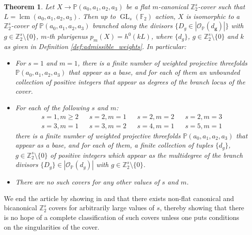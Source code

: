 \documentclass[12pt,twoside,]{amsart}
\theoremstyle{plain}
\newtheorem{theorem}{Theorem}[subsection]
\theoremstyle{definition}
\begin{document}
 
\begin{theorem}\label{thm:flat_pluricanonical_covers}
Let $X \rightarrow \mathbb{P}(a_0, a_1, a_2, a_3)$ be a flat $m$-canonical $\mathbb{Z}_2^s$-cover such that $L = \operatorname{lcm}(a_0, a_1, a_2, a_3)$. Then up to $\operatorname{GL}_s(\mathbb{F}_2)$ action,  $X$ is isomorphic to a $\mathbb{Z}_2^s$-cover of $\mathbb{P}(a_0,a_1,a_2,a_3)$ branched along the divisors $\{D_g \in |\mathcal{O}_{\mathbb{P}}(d_\mathbf{g})|\}$ with ${g \in \mathbb{Z}_2^s \setminus \{0\}}$, $m$-th plurigenus $p_m(X) = h^0(kL)$, where $\{d_g\}$, $g \in \mathbb{Z}_2^s \setminus \{0\}$ and $k$ as given in Definition \ref{def:admissible_weights}. In particular:
\begin{itemize}
 \item[(i)] For $s=1$ and $m=1$, there is a finite number of weighted projective threefolds $\mathbb{P}(a_0, a_1, a_2,a_3)$ that appear as a base, and for each of them an unbounded collection of positive integers that appear as degrees of the branch locus of the cover. 
\item[(ii)] For each of the following $s$ and $m$:
\begin{align*}
s=1, m\geq 2 && s = 2, m=1 &&    s = 2, m=2 && s = 2, m=3 \\
s = 3, m=1 && s=3, m=2 &&s= 4, m=1 &&s=5, m=1
\end{align*}
there is a finite number of weighted projective threefolds $\mathbb{P}(a_0, a_1, a_2,a_3)$ that appear as a base, and for each of them, a finite collection of tuples $\{d_g\}$, $g \in \mathbb{Z}_2^s \setminus \{0\}$ of positive integers which appear as the multidegree of the branch divisors 
$\{D_g\} \in |\mathcal{O}_{\mathbb{P}}(d_g)|$ with $g \in \mathbb{Z}_2^s \setminus \{0\} $. 
\item[(iii)] There are no such covers for any other values of $s$ and $m$.
\end{itemize}
\end{theorem}
 
We end the article by showing in  and  that there exists non-flat canonical and bicanonical $\mathbb{Z}_2^s$ covers for arbitrarily large values of $s$, thereby showing that there is no hope of a complete classification of such covers unless one puts conditions on the singularities of the cover.
\end{document}
